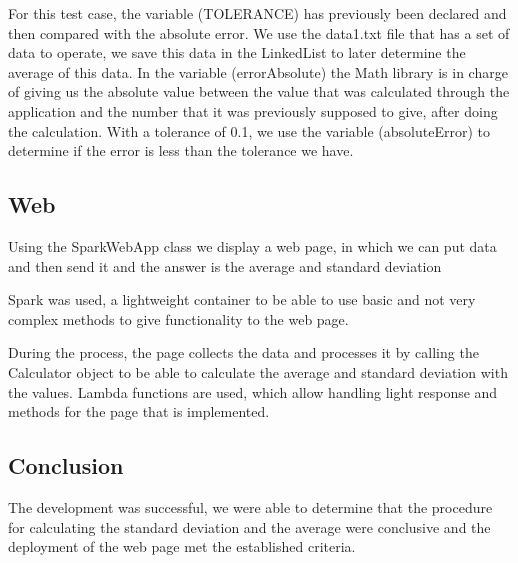 \documentclass[
	12pt, %
]{fphw}
\begin{document}
For this test case, the variable (TOLERANCE) has previously been declared and then compared with the absolute error.
We use the data1.txt file that has a set of data to operate, we save this data in the LinkedList to later determine the average of this data.
In the variable (errorAbsolute) the Math library is in charge of giving us the absolute value between the value that was calculated through the application and the number that it was previously supposed to give, after doing the calculation.
With a tolerance of 0.1, we use the variable (absoluteError) to determine if the error is less than the tolerance we have.


\subsection * {Web}

Using the SparkWebApp class we display a web page, in which we can put data and then send it and the answer is the average and standard deviation

Spark was used, a lightweight container to be able to use basic and not very complex methods to give functionality to the web page.

During the process, the page collects the data and processes it by calling the Calculator object to be able to calculate the average and standard deviation with the values.
Lambda functions are used, which allow handling light response and methods for the page that is implemented.

\subsection * {Conclusion}

The development was successful, we were able to determine that the procedure for calculating the standard deviation and the average were conclusive and the deployment of the web page met the established criteria.

\end{document}
